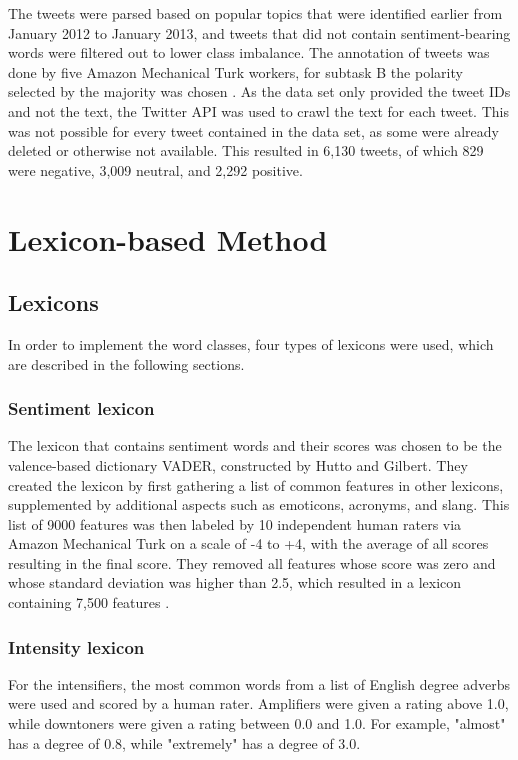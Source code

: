 The tweets were parsed based on popular topics that were identified earlier from January 2012 to January 2013, and tweets that did not contain sentiment-bearing words were filtered out to lower class imbalance. The annotation of tweets was done by five Amazon Mechanical Turk workers, for subtask B the polarity selected by the majority was chosen \cite{nakov-etal-2013-semeval}. As the data set only provided the tweet IDs and not the text, the Twitter API was used to crawl the text for each tweet. This was not possible for every tweet contained in the data set, as some were already deleted or otherwise not available. This resulted in 6,130 tweets, of which 829 were negative, 3,009 neutral, and 2,292 positive.

\section{Lexicon-based Method}

\subsection{Lexicons}
In order to implement the word classes, four types of lexicons were used, which are described in the following sections.

\subsubsection{Sentiment lexicon}
The lexicon that contains sentiment words and their scores was chosen to be the valence-based dictionary VADER, constructed by Hutto and Gilbert. They created the lexicon by first gathering a list of common features in other lexicons, supplemented by additional aspects such as emoticons, acronyms, and slang. This list of 9000 features was then labeled by 10 independent human raters via Amazon Mechanical Turk on a scale of -4 to +4, with the average of all scores resulting in the final score. They removed all features whose score was zero and whose standard deviation was higher than 2.5, which resulted in a lexicon containing 7,500 features \cite{DBLP:conf/icwsm/HuttoG14}.

\subsubsection{Intensity lexicon}
For the intensifiers, the most common words from a list of English degree adverbs \cite{wiki:adverbs} were used and scored by a human rater. Amplifiers were given a rating above 1.0, while downtoners were given a rating between 0.0 and 1.0. For example, "almost" has a degree of 0.8, while "extremely" has a degree of 3.0.


